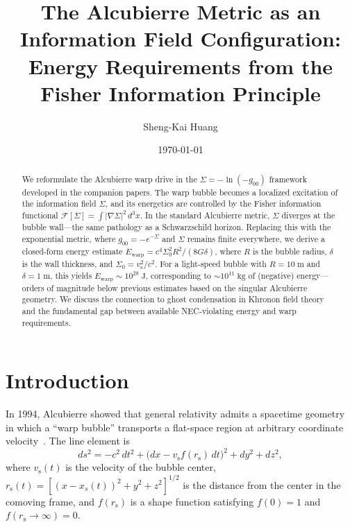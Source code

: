\documentclass[prd,twocolumn,superscriptaddress,longbibliography]{revtex4-2}
\newcommand{\vs}{v_{\mathrm{s}}}
\newcommand{\rs}{r_{\mathrm{s}}}
\newcommand{\Ewarp}{E_{\mathrm{warp}}}
\newcommand{\Fisher}{\mathcal{F}}
\begin{document}
\title{The Alcubierre Metric as an Information Field Configuration:\\
Energy Requirements from the Fisher Information Principle}

\author{Sheng-Kai Huang}

\date{\today}

\begin{abstract}
We reformulate the Alcubierre warp drive in the $\Sigma = -\ln(-g_{00})$ framework
developed in the companion papers.  The warp bubble becomes a localized
excitation of the information field $\Sigma$, and its energetics are
controlled by the Fisher information functional
$\Fisher[\Sigma] = \int |\nabla\Sigma|^2\,d^3x$.
In the standard Alcubierre metric, $\Sigma$ diverges at the bubble wall---the
same pathology as a Schwarzschild horizon.  Replacing this with the exponential
metric, where $g_{00} = -e^{-\Sigma}$ and $\Sigma$ remains finite everywhere,
we derive a closed-form energy estimate
$\Ewarp = c^4 \Sigma_0^2 R^2 / (8G\delta)$,
where $R$ is the bubble radius, $\delta$ is the wall thickness, and
$\Sigma_0 = \vs^2/c^2$.  For a light-speed bubble with $R = 10\;\mathrm{m}$
and $\delta = 1\;\mathrm{m}$, this yields $\Ewarp \sim 10^{28}\;\mathrm{J}$,
corresponding to $\sim 10^{11}\;\mathrm{kg}$ of (negative) energy---orders of
magnitude below previous estimates based on the singular Alcubierre geometry.
We discuss the connection to ghost condensation in Khronon field theory and
the fundamental gap between available NEC-violating energy and warp requirements.
\end{abstract}

\maketitle

\section{Introduction}
\label{sec:intro}

In 1994, Alcubierre showed that general relativity admits a
spacetime geometry in which a ``warp bubble'' transports a flat-space
region at arbitrary coordinate velocity~\cite{Alcubierre1994}.  The
line element is
\begin{equation}
\label{eq:Alcubierre}
ds^2 = -c^2\,dt^2 + \bigl(dx - \vs f(\rs)\,dt\bigr)^2 + dy^2 + dz^2,
\end{equation}
where $\vs(t)$ is the velocity of the bubble center,
$\rs(t) = [(x - x_s(t))^2 + y^2 + z^2]^{1/2}$ is the distance from
the center in the comoving frame, and $f(\rs)$ is a shape function
satisfying $f(0) = 1$ and $f(\rs \to \infty) = 0$.
\end{document}
